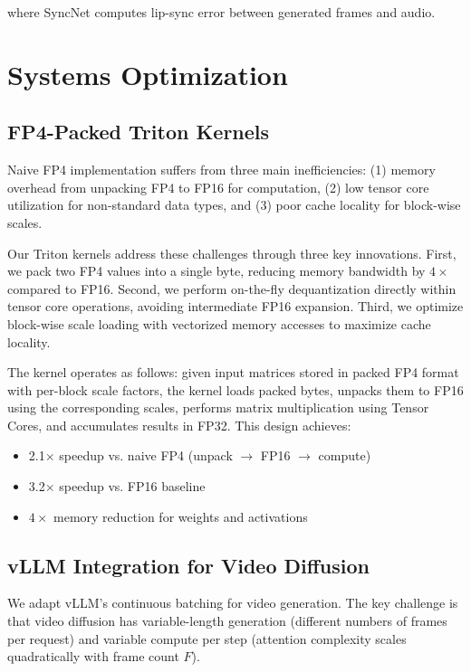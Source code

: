 \documentclass[journal,twoside]{IEEEtran}
\theoremstyle{definition}
\theoremstyle{remark}
\begin{document}
where SyncNet \cite{chung2019syncnet} computes lip-sync error between generated frames and audio.

\section{Systems Optimization}
\label{sec:systems}

\subsection{FP4-Packed Triton Kernels}

Naive FP4 implementation suffers from three main inefficiencies: (1) memory overhead from unpacking FP4 to FP16 for computation, (2) low tensor core utilization for non-standard data types, and (3) poor cache locality for block-wise scales.

Our Triton kernels address these challenges through three key innovations. First, we pack two FP4 values into a single byte, reducing memory bandwidth by $4\times$ compared to FP16. Second, we perform on-the-fly dequantization directly within tensor core operations, avoiding intermediate FP16 expansion. Third, we optimize block-wise scale loading with vectorized memory accesses to maximize cache locality.

The kernel operates as follows: given input matrices stored in packed FP4 format with per-block scale factors, the kernel loads packed bytes, unpacks them to FP16 using the corresponding scales, performs matrix multiplication using Tensor Cores, and accumulates results in FP32. This design achieves:
\begin{itemize}
    \item 2.1$\times$ speedup vs. naive FP4 (unpack $\rightarrow$ FP16 $\rightarrow$ compute)
    \item 3.2$\times$ speedup vs. FP16 baseline
    \item $4\times$ memory reduction for weights and activations
\end{itemize}

\subsection{vLLM Integration for Video Diffusion}

We adapt vLLM's continuous batching for video generation. The key challenge is that video diffusion has variable-length generation (different numbers of frames per request) and variable compute per step (attention complexity scales quadratically with frame count $F$).
\end{document}
